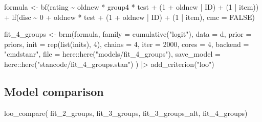 \documentclass[
  man,floatsintext]{apa7}
\newenvironment{Shaded}{\begin{snugshade}}{\end{snugshade}}
\newcommand{\AttributeTok}[1]{\textcolor[rgb]{0.77,0.63,0.00}{#1}}
\newcommand{\ConstantTok}[1]{\textcolor[rgb]{0.00,0.00,0.00}{#1}}
\newcommand{\DecValTok}[1]{\textcolor[rgb]{0.00,0.00,0.81}{#1}}
\newcommand{\FunctionTok}[1]{\textcolor[rgb]{0.00,0.00,0.00}{#1}}
\newcommand{\NormalTok}[1]{#1}
\newcommand{\OtherTok}[1]{\textcolor[rgb]{0.56,0.35,0.01}{#1}}
\newcommand{\SpecialCharTok}[1]{\textcolor[rgb]{0.00,0.00,0.00}{#1}}
\newcommand{\StringTok}[1]{\textcolor[rgb]{0.31,0.60,0.02}{#1}}
\begin{document}
\begin{Shaded}
\begin{Highlighting}[]
\NormalTok{formula }\OtherTok{\textless{}{-}} \FunctionTok{bf}\NormalTok{(rating }\SpecialCharTok{\textasciitilde{}}\NormalTok{ oldnew }\SpecialCharTok{*}\NormalTok{ group4 }\SpecialCharTok{*}\NormalTok{ test }\SpecialCharTok{+}
\NormalTok{  (}\DecValTok{1} \SpecialCharTok{+}\NormalTok{ oldnew }\SpecialCharTok{|}\NormalTok{ ID) }\SpecialCharTok{+}\NormalTok{ (}\DecValTok{1} \SpecialCharTok{|}\NormalTok{ item)) }\SpecialCharTok{+}
  \FunctionTok{lf}\NormalTok{(disc }\SpecialCharTok{\textasciitilde{}} \DecValTok{0} \SpecialCharTok{+}\NormalTok{ oldnew }\SpecialCharTok{*}\NormalTok{ test }\SpecialCharTok{+}
\NormalTok{    (}\DecValTok{1} \SpecialCharTok{+}\NormalTok{ oldnew }\SpecialCharTok{|}\NormalTok{ ID) }\SpecialCharTok{+}\NormalTok{ (}\DecValTok{1} \SpecialCharTok{|}\NormalTok{ item), }\AttributeTok{cmc =} \ConstantTok{FALSE}\NormalTok{)}

\NormalTok{fit\_4\_groups }\OtherTok{\textless{}{-}} \FunctionTok{brm}\NormalTok{(formula,}
  \AttributeTok{family =} \FunctionTok{cumulative}\NormalTok{(}\StringTok{"logit"}\NormalTok{),}
  \AttributeTok{data =}\NormalTok{ d,}
  \AttributeTok{prior =}\NormalTok{ priors,}
  \AttributeTok{init =} \FunctionTok{rep}\NormalTok{(}\FunctionTok{list}\NormalTok{(inits), }\DecValTok{4}\NormalTok{),}
  \AttributeTok{chains =} \DecValTok{4}\NormalTok{, }\AttributeTok{iter =} \DecValTok{2000}\NormalTok{, }\AttributeTok{cores =} \DecValTok{4}\NormalTok{,}
  \AttributeTok{backend =} \StringTok{"cmdstanr"}\NormalTok{,}
  \AttributeTok{file =}\NormalTok{ here}\SpecialCharTok{::}\FunctionTok{here}\NormalTok{(}\StringTok{"models/fit\_4\_groups"}\NormalTok{),}
  \AttributeTok{save\_model =}\NormalTok{ here}\SpecialCharTok{::}\FunctionTok{here}\NormalTok{(}\StringTok{"stancode/fit\_4\_groups.stan"}\NormalTok{)}
\NormalTok{) }\SpecialCharTok{|\textgreater{}}
  \FunctionTok{add\_criterion}\NormalTok{(}\StringTok{"loo"}\NormalTok{)}
\end{Highlighting}
\end{Shaded}

\hypertarget{model-comparison-1}{%
\subsection{Model comparison}\label{model-comparison-1}}

\begin{Shaded}
\begin{Highlighting}[]
\FunctionTok{loo\_compare}\NormalTok{(}
\NormalTok{  fit\_2\_groups,}
\NormalTok{  fit\_3\_groups,}
\NormalTok{  fit\_3\_groups\_alt,}
\NormalTok{  fit\_4\_groups)}
\end{Highlighting}
\end{Shaded}
\end{document}
